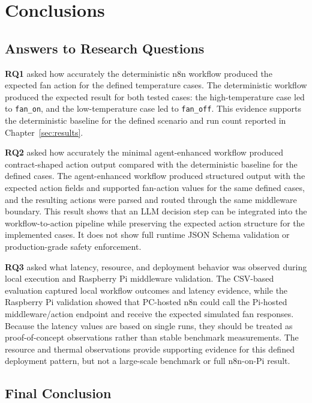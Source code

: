 \section{Conclusions}\label{sec:conclusions}

\subsection{Answers to Research Questions}\label{subsec:conclusion-research-questions}

\textbf{RQ1} asked how accurately the deterministic n8n workflow produced the expected fan action for the defined temperature cases. The deterministic workflow produced the expected result for both tested cases: the high-temperature case led to \texttt{fan\_on}, and the low-temperature case led to \texttt{fan\_off}. This evidence supports the deterministic baseline for the defined scenario and run count reported in Chapter~\ref{sec:results}.

\textbf{RQ2} asked how accurately the minimal agent-enhanced workflow produced contract-shaped action output compared with the deterministic baseline for the defined cases. The agent-enhanced workflow produced structured output with the expected action fields and supported fan-action values for the same defined cases, and the resulting actions were parsed and routed through the same middleware boundary. This result shows that an LLM decision step can be integrated into the workflow-to-action pipeline while preserving the expected action structure for the implemented cases. It does not show full runtime JSON Schema validation or production-grade safety enforcement.


\textbf{RQ3} asked what latency, resource, and deployment behavior was observed during local execution and Raspberry Pi middleware validation. The CSV-based evaluation captured local workflow outcomes and latency evidence, while the Raspberry Pi validation showed that PC-hosted n8n could call the Pi-hosted middleware/action endpoint and receive the expected simulated fan responses. Because the latency values are based on single runs, they should be treated as proof-of-concept observations rather than stable benchmark measurements. The resource and thermal observations provide supporting evidence for this defined deployment pattern, but not a large-scale benchmark or full n8n-on-Pi result.

\subsection{Final Conclusion}\label{subsec:final-conclusion}


